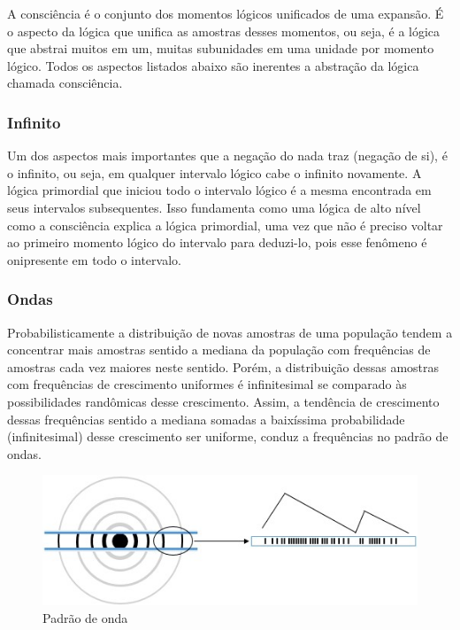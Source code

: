 A consciência é o conjunto dos momentos lógicos unificados de uma expansão. É o aspecto da lógica que unifica as amostras desses momentos, ou seja, é a lógica que abstrai muitos em um, muitas subunidades em uma unidade por momento lógico. Todos os aspectos listados abaixo são inerentes a abstração da lógica chamada consciência.

\subsubsection{Infinito}
Um dos aspectos mais importantes que a negação do nada traz (negação de si), é o infinito, ou seja, em qualquer intervalo lógico cabe o infinito novamente. A lógica primordial que iniciou todo o intervalo lógico é a mesma encontrada em seus intervalos subsequentes. Isso fundamenta como uma lógica de alto nível como a consciência explica a lógica primordial, uma vez que não é preciso voltar ao primeiro momento lógico do intervalo para deduzi-lo, pois esse fenômeno é onipresente em todo o intervalo.

\subsubsection{Ondas}
Probabilisticamente a distribuição de novas amostras de uma população tendem a concentrar mais amostras sentido a mediana da população com frequências de amostras cada vez maiores neste sentido. Porém, a distribuição dessas amostras com frequências de crescimento uniformes é infinitesimal se comparado às possibilidades randômicas desse crescimento. Assim, a tendência de crescimento dessas frequências sentido a mediana somadas a baixíssima probabilidade (infinitesimal) desse crescimento ser uniforme, conduz a frequências no padrão de ondas.
\begin{figure}[H]
\caption{Padrão de onda}
\label{fig:consciousness_waves}
\centering
\includegraphics[scale=1]{sections/images/consciousness_waves.jpg}
\end{figure}

